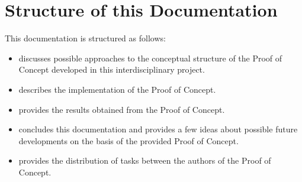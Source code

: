 \section*{Structure of this Documentation}

This documentation is structured as follows:

\begin{itemize}
\item \textbf{} discusses possible approaches to the conceptual structure of the Proof of Concept developed in this interdisciplinary project.
\item \textbf{} describes the implementation of the Proof of Concept.
\item \textbf{} provides the results obtained from the Proof of Concept.
\item \textbf{} concludes this documentation and provides a few ideas about possible future developments on the basis of the provided Proof of Concept.
\item \textbf{} provides the distribution of tasks between the authors of the Proof of Concept.
\end{itemize}


